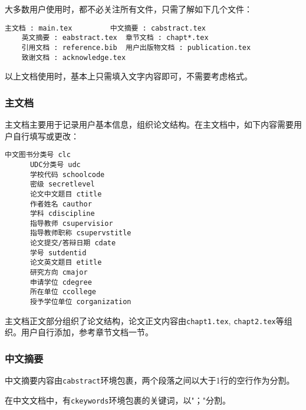 大多数用户使用时，都不必关注所有文件，只需了解如下几个文件：

\begin{center}
  \begin{minipage}{0.95\textwidth}
    \begin{Verbatim}[frame=single]
    主文档 : main.tex         中文摘要 : cabstract.tex
    英文摘要 : eabstract.tex  章节文档 : chapt*.tex
    引用文档 : reference.bib  用户出版物文档 : publication.tex
    致谢文档 : acknowledge.tex
    \end{Verbatim}
  \end{minipage}
\end{center}

以上文档使用时，基本上只需填入文字内容即可，不需要考虑格式。

\subsubsection{主文档}

主文档主要用于记录用户基本信息，组织论文结构。在主文档中，如下内容需要用户自行填写或更改：

\begin{center}
  \begin{minipage}{0.65\textwidth}
    \begin{Verbatim}[frame=single]
      中文图书分类号 clc
      UDC分类号 udc
      学校代码 schoolcode
      密级 secretlevel
      论文中文题目 ctitle
      作者姓名 cauthor
      学科 cdiscipline
      指导教师 csupervisior
      指导教师职称 csupervstitle
      论文提交/答辩日期 cdate
      学号 sutdentid
      论文英文题目 etitle
      研究方向 cmajor
      申请学位 cdegree
      所在单位 ccollege
      授予学位单位 corganization
    \end{Verbatim}
  \end{minipage}
\end{center}

主文档正文部分组织了论文结构，论文正文内容由\verb |chapt1.tex|, \verb|chapt2.tex|等组织。用户自行添加，参考章节文档一节。%

\subsubsection{中文摘要}

中文摘要内容由\verb|cabstract|环境包裹，两个段落之间以大于1行的空行作为分割。

在中文文档中，有\verb|ckeywords|环境包裹的关键词，以"；"分割。

